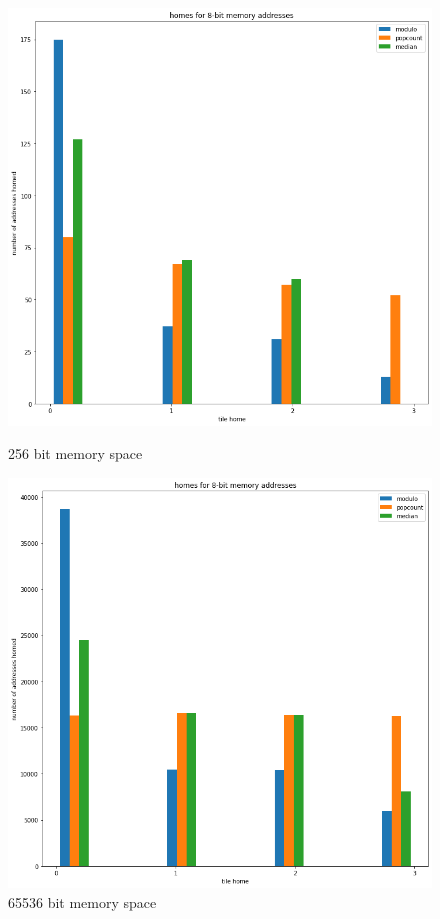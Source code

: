 \begin{figure}[h]
  \centering
  \begin{minipage}[b]{0.4\textwidth}
    \includegraphics[width=\textwidth]{homes.png}
    \caption{256 bit memory space}
    \label{Fig:homes}
  \end{minipage}
  \hfill
  \begin{minipage}[b]{0.4\textwidth}
    \includegraphics[width=\textwidth]{homes2.png}
    \caption{65536 bit memory space }
    \label{Fig:homes2}
  \end{minipage}
\end{figure}

